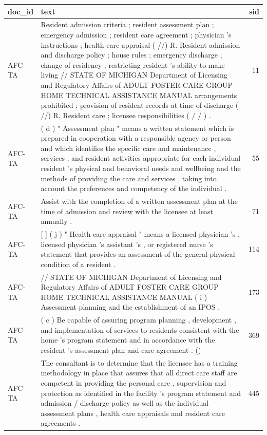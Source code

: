 \documentclass[
]{book}
\begin{document}
\begin{tabular}{l|l|r}
\hline
doc\_id & text & sid\\
\hline
AFC-TA & Resident admission criteria ; resident assessment plan ; emergency admission ; resident care agreement ; physician 's instructions ; health care appraisal ( //) R. Resident admission and discharge policy ; house rules ; emergency discharge ; change of residency ; restricting resident 's ability to make living // STATE OF MICHIGAN Department of Licensing and Regulatory Affairs of ADULT FOSTER CARE GROUP HOME TECHNICAL ASSISTANCE MANUAL arrangements prohibited ; provision of resident records at time of discharge ( //) R. Resident care ; licensee responsibilities ( / / ) . & 11\\
\hline
AFC-TA & ( d ) " Assessment plan " means a written statement which is prepared in cooperation with a responsible agency or person and which identifies the specific care and maintenance , services , and resident activities appropriate for each individual resident 's physical and behavioral needs and wellbeing and the methods of providing the care and services , taking into account the preferences and competency of the individual . & 55\\
\hline
AFC-TA & Assist with the completion of a written assessment plan at the time of admission and review with the licensee at least annually . & 71\\
\hline
AFC-TA & [ ] ( j ) " Health care appraisal " means a licensed physician 's , licensed physician 's assistant 's , or registered nurse 's statement that provides an assessment of the general physical condition of a resident . & 114\\
\hline
AFC-TA & // STATE OF MICHIGAN Department of Licensing and Regulatory Affairs of ADULT FOSTER CARE GROUP HOME TECHNICAL ASSISTANCE MANUAL ( i ) Assessment planning and the establishment of an IPOS . & 173\\
\hline
AFC-TA & ( c ) Be capable of assuring program planning , development , and implementation of services to residents consistent with the home 's program statement and in accordance with the resident 's assessment plan and care agreement . () & 369\\
\hline
AFC-TA & The consultant is to determine that the licensee has a training methodology in place that assures that all direct care staff are competent in providing the personal care , supervision and protection as identified in the facility 's program statement and admission / discharge policy as well as the individual assessment plans , health care appraisals and resident care agreements . & 445\\

\end{tabular}
\end{document}
